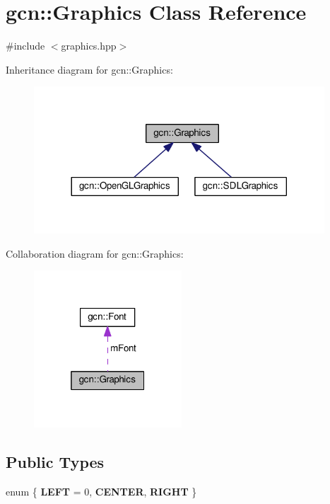 \hypertarget{classgcn_1_1Graphics}{}\section{gcn\+:\+:Graphics Class Reference}
\label{classgcn_1_1Graphics}


{\ttfamily \#include $<$graphics.\+hpp$>$}



Inheritance diagram for gcn\+:\+:Graphics\+:\nopagebreak
\begin{figure}[H]
\begin{center}
\leavevmode
\includegraphics[width=308pt]{classgcn_1_1Graphics__inherit__graph}
\end{center}
\end{figure}


Collaboration diagram for gcn\+:\+:Graphics\+:\nopagebreak
\begin{figure}[H]
\begin{center}
\leavevmode
\includegraphics[width=157pt]{classgcn_1_1Graphics__coll__graph}
\end{center}
\end{figure}
\subsection*{Public Types}
\begin{DoxyCompactItemize}
\item 
enum \{ {\bfseries L\+E\+FT} = 0, 
{\bfseries C\+E\+N\+T\+ER}, 
{\bfseries R\+I\+G\+HT}
 \}
\end{DoxyCompactItemize}
